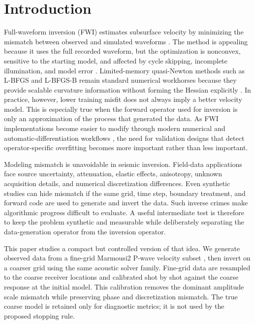 \documentclass[10pt,twocolumn]{article}
\begin{document}
\section{Introduction}
Full-waveform inversion (FWI) estimates subsurface velocity by minimizing
the mismatch between observed and simulated waveforms
\cite{tarantola1984inversion,virieux2009overview}. The method is
appealing because it uses the full recorded waveform, but the optimization
is nonconvex, sensitive to the starting model, and affected by cycle
skipping, incomplete illumination, and model error
\cite{pratt1999seismic,bunks1995multiscale,vanleeuwen2013mitigating}.
Limited-memory quasi-Newton methods such as L-BFGS and L-BFGS-B remain
standard numerical workhorses because they provide scalable curvature
information without forming the Hessian explicitly
\cite{nocedal1980updating,liu1989limited,byrd1995limited}. In practice,
however, lower training misfit does not always imply a better velocity
model. This is especially true when the forward operator used for
inversion is only an approximation of the process that generated the data.
As FWI implementations become easier to modify through modern numerical
and automatic-differentiation workflows \cite{zhu2021integrating}, the
need for validation designs that detect operator-specific overfitting
becomes more important rather than less important.

Modeling mismatch is unavoidable in seismic inversion. Field-data
applications face source uncertainty, attenuation, elastic effects,
anisotropy, unknown acquisition details, and numerical discretization
differences. Even synthetic studies can hide mismatch if the same grid,
time step, boundary treatment, and forward code are used to generate and
invert the data. Such inverse crimes make algorithmic progress difficult
to evaluate. A useful intermediate test is therefore to keep the problem
synthetic and measurable while deliberately separating the data-generation
operator from the inversion operator.

This paper studies a compact but controlled version of that idea. We
generate observed data from a fine-grid Marmousi2 P-wave velocity subset
\cite{versteeg1994marmousi,martin2006marmousi2}, then invert on a
coarser grid using the same acoustic solver family. Fine-grid data are
resampled to the coarse receiver locations and calibrated shot by shot
against the coarse response at the initial model. This calibration removes
the dominant amplitude scale mismatch while preserving phase and
discretization mismatch. The true coarse model is retained only for
diagnostic metrics; it is not used by the proposed stopping rule.
\end{document}
